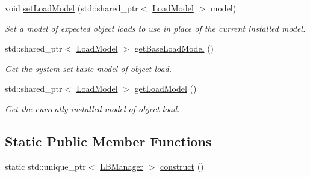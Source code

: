 \begin{DoxyCompactItemize}
void \hyperlink{structvt_1_1vrt_1_1collection_1_1balance_1_1_l_b_manager_a57813a70e0395907021a14c9e2bc1916}{set\+Load\+Model} (std\+::shared\+\_\+ptr$<$ \hyperlink{classvt_1_1vrt_1_1collection_1_1balance_1_1_load_model}{Load\+Model} $>$ model)
\begin{DoxyCompactList}\small\item\em Set a model of expected object loads to use in place of the current installed model. \end{DoxyCompactList}\item 
std\+::shared\+\_\+ptr$<$ \hyperlink{classvt_1_1vrt_1_1collection_1_1balance_1_1_load_model}{Load\+Model} $>$ \hyperlink{structvt_1_1vrt_1_1collection_1_1balance_1_1_l_b_manager_a9822187c2745a7b3b9c4a5929f8e3cc4}{get\+Base\+Load\+Model} ()
\begin{DoxyCompactList}\small\item\em Get the system-\/set basic model of object load. \end{DoxyCompactList}\item 
std\+::shared\+\_\+ptr$<$ \hyperlink{classvt_1_1vrt_1_1collection_1_1balance_1_1_load_model}{Load\+Model} $>$ \hyperlink{structvt_1_1vrt_1_1collection_1_1balance_1_1_l_b_manager_aaa442ee117e8c9c978c77275cb3e6404}{get\+Load\+Model} ()
\begin{DoxyCompactList}\small\item\em Get the currently installed model of object load. \end{DoxyCompactList}\end{DoxyCompactItemize}
\subsection*{Static Public Member Functions}
\begin{DoxyCompactItemize}
\item 
static std\+::unique\+\_\+ptr$<$ \hyperlink{structvt_1_1vrt_1_1collection_1_1balance_1_1_l_b_manager}{L\+B\+Manager} $>$ \hyperlink{structvt_1_1vrt_1_1collection_1_1balance_1_1_l_b_manager_ae8e69a0540bb87b40ee86d2c1fe31cd5}{construct} ()
\end{DoxyCompactItemize}
